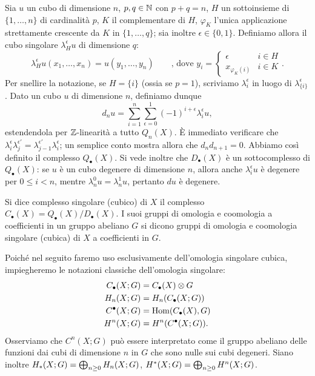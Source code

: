 Sia $u$ un cubo di dimensione $n$, $p,q\in\mathbb{N}$ con $p+q=n$, $H$ un sottoinsieme di $\{1,\ldots,n\}$ di cardinalità $p$, $K$ il complementare di $H$, $\varphi_K$ l'unica applicazione strettamente crescente da $K$ in $\{1,\ldots,q\}$; sia inoltre $\epsilon\in\{0,1\}$. Definiamo allora il cubo singolare $\lambda^\epsilon_Hu$ di dimensione $q$:
$$
\lambda^\epsilon_Hu(x_1,\ldots,x_n)=u(y_1,\ldots,y_n)\qquad\text{, dove }y_i=\begin{cases}\epsilon&i\in H\\x_{\varphi_K(i)}&i\in K\end{cases}.
$$
Per snellire la notazione, se $H=\{i\}$ (ossia se $p=1$), scriviamo $\lambda^\epsilon_i$ in luogo di $\lambda^\epsilon_{\{i\}}$. Dato un cubo $u$ di dimensione $n$, definiamo dunque
$$
d_nu=\sum_{i=1}^n\sum_{\epsilon=0}^1(-1)^{i+\epsilon}\lambda^\epsilon_iu,
$$
estendendola per $\mathbb{Z}$-linearità a tutto $Q_n(X)$. È immediato verificare che $\lambda^\epsilon_i\lambda^{\epsilon'}_j=\lambda^{\epsilon'}_{j-1}\lambda^\epsilon_i$; un semplice conto mostra allora che $d_nd_{n+1}=0$. Abbiamo così definito il complesso $Q_\bullet(X)$. Si vede inoltre che $D_\bullet(X)$ è un sottocomplesso di $Q_\bullet(X)$: se $u$ è un cubo degenere di dimensione $n$, allora anche $\lambda^\epsilon_iu$ è degenere per $0\le i<n$, mentre $\lambda^0_nu=\lambda^1_nu$, pertanto $du$ è degenere.
\begin{definition}
Si dice complesso singolare (cubico) di $X$ il complesso $C_\bullet(X)=Q_\bullet(X)/D_\bullet(X)$. I suoi gruppi di omologia e coomologia a coefficienti in un gruppo abeliano $G$ si dicono gruppi di omologia e coomologia singolare (cubica) di $X$ a coefficienti in $G$.
\end{definition}
Poiché nel seguito faremo uso esclusivamente dell'omologia singolare cubica, impiegheremo le notazioni classiche dell'omologia singolare: 
\begin{align*}
C_\bullet(X;G)&=C_\bullet(X)\mathbin{\otimes} G\\
H_n(X;G)&=H_n(C_\bullet(X;G))\\
C^\bullet(X;G)&=\operatorname{Hom}(C_\bullet(X),G)\\
H^n(X;G)&=H^n(C^\bullet(X;G)).
\end{align*}
Osserviamo che $C^n(X;G)$ può essere interpretato come il gruppo abeliano delle funzioni dai cubi di dimensione $n$ in $G$ che sono nulle sui cubi degeneri. Siano inoltre $H_*(X;G)=\bigoplus_{n\ge 0}H_n(X;G)$, $H^*(X;G)=\bigoplus_{n\ge 0}H^n(X;G)$.

